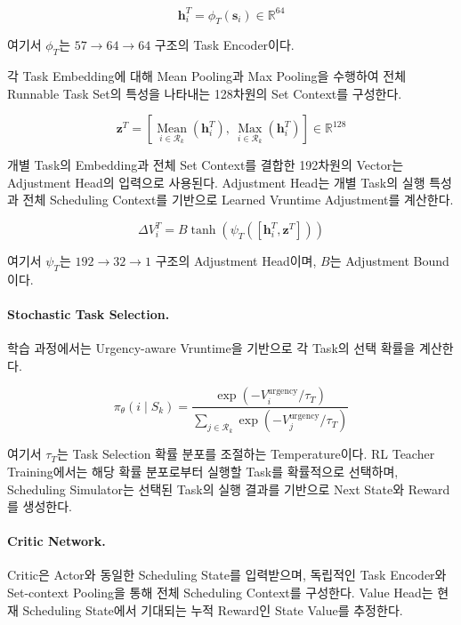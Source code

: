 \begin{equation}
    \mathbf{h}_i^T = \phi_T(\mathbf{s}_i) \in \mathbb{R}^{64}
\end{equation}

여기서 $\phi_T$는 $57 \rightarrow 64 \rightarrow 64$ 구조의 Task Encoder이다.

각 Task Embedding에 대해 Mean Pooling과 Max Pooling을
수행하여 전체 Runnable Task Set의
특성을 나타내는 128차원의 Set Context를 구성한다.

\begin{equation}
    \mathbf{z}^T = \left[\underset{i\in\mathcal{R}_k}{\operatorname{Mean}}(\mathbf{h}_i^T),\ \underset{i\in\mathcal{R}_k}{\operatorname{Max}}(\mathbf{h}_i^T)\right] \in \mathbb{R}^{128}
\end{equation}

 개별 Task의 Embedding과 전체 Set Context를 결합한
192차원의 Vector는 Adjustment Head의 입력으로 사용된다.
Adjustment Head는 개별 Task의 실행 특성과
전체 Scheduling Context를 기반으로
 Learned Vruntime Adjustment를 계산한다.

\begin{equation}
    \Delta V_i^T = B\tanh\left(\psi_T([\mathbf{h}_i^T,\mathbf{z}^T])\right)
\end{equation}

여기서 $\psi_T$는 $192 \rightarrow 32 \rightarrow 1$ 구조의 Adjustment Head이며, $B$는 Adjustment Bound이다.

\paragraph{Stochastic Task Selection.}
학습 과정에서는 Urgency-aware Vruntime을 기반으로
각 Task의 선택 확률을 계산한다.

\begin{equation}
    \pi_{\theta}(i\mid S_k)
    =
    \frac{
        \exp(-V_i^{\mathrm{urgency}}/\tau_T)
    }{
        \sum_{j\in\mathcal{R}_k}
        \exp(-V_j^{\mathrm{urgency}}/\tau_T)
    }
    \label{eq:teacher_policy}
\end{equation}

여기서 $\tau_T$는 Task Selection 확률 분포를 조절하는 Temperature이다.
RL Teacher Training에서는 해당 확률 분포로부터 실행할 Task를 확률적으로 선택하며,
Scheduling Simulator는 선택된 Task의 실행 결과를
기반으로 Next State와 Reward를 생성한다.

\paragraph{Critic Network.}
Critic은 Actor와 동일한 Scheduling State를 입력받으며,
독립적인 Task Encoder와 Set-context Pooling을 통해
전체 Scheduling Context를 구성한다.
Value Head는 현재 Scheduling State에서 기대되는
누적 Reward인 State Value를 추정한다.


